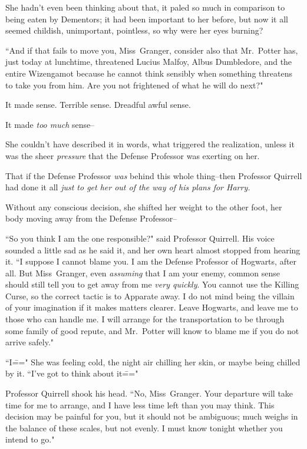 She hadn't even been thinking about that, it paled so much in comparison to being eaten by Dementors; it had been important to her before, but now it all seemed childish, unimportant, pointless, so why were her eyes burning?

``And if that fails to move you, Miss~Granger, consider also that Mr.~Potter has, just today at lunchtime, threatened Lucius Malfoy, Albus Dumbledore, and the entire Wizengamot because he cannot think sensibly when something threatens to take you from him. Are you not frightened of what he will do next?"

It made sense. Terrible sense. Dreadful awful sense.

It made \emph{too much} sense\---

She couldn't have described it in words, what triggered the realization, unless it was the sheer \emph{pressure} that the Defense Professor was exerting on her.

That if the Defense Professor \emph{was} behind this whole thing\---then Professor Quirrell had done it all \emph{just to get her out of the way of his plans for Harry.}

Without any conscious decision, she shifted her weight to the other foot, her body moving away from the Defense Professor\---

``So you think I am the one responsible?" said Professor Quirrell. His voice sounded a little sad as he said it, and her own heart almost stopped from hearing it. ``I suppose I cannot blame you. I am the Defense Professor of Hogwarts, after all. But Miss~Granger, even \emph{assuming} that I am your enemy, common sense should still tell you to get away from me \emph{very quickly}. You cannot use the Killing Curse, so the correct tactic is to Apparate away. I do not mind being the villain of your imagination if it makes matters clearer. Leave Hogwarts, and leave me to those who can handle me. I will arrange for the transportation to be through some family of good repute, and Mr.~Potter will know to blame me if you do not arrive safely."

``I\===" She was feeling cold, the night air chilling her skin, or maybe being chilled by it. ``I've got to think about it\==="

Professor Quirrell shook his head. ``No, Miss~Granger. Your departure will take time for me to arrange, and I have less time left than you may think. This decision may be painful for you, but it should not be ambiguous; much weighs in the balance of these scales, but not evenly. I must know tonight whether you intend to go."

